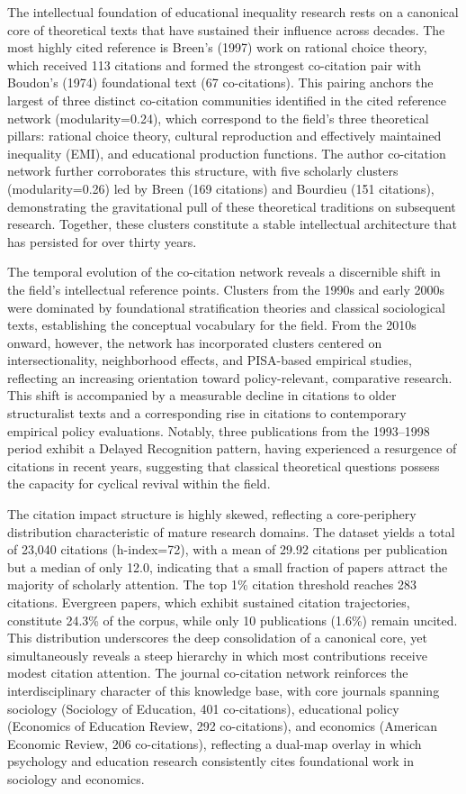 \documentclass[12pt,a4paper]{article}
\begin{document}
The intellectual foundation of educational inequality research rests on a canonical core of theoretical texts that have sustained their influence across decades. The most highly cited reference is Breen's (1997) work on rational choice theory, which received 113 citations and formed the strongest co-citation pair with Boudon's (1974) foundational text (67 co-citations). This pairing anchors the largest of three distinct co-citation communities identified in the cited reference network (modularity=0.24), which correspond to the field's three theoretical pillars: rational choice theory, cultural reproduction and effectively maintained inequality (EMI), and educational production functions. The author co-citation network further corroborates this structure, with five scholarly clusters (modularity=0.26) led by Breen (169 citations) and Bourdieu (151 citations), demonstrating the gravitational pull of these theoretical traditions on subsequent research. Together, these clusters constitute a stable intellectual architecture that has persisted for over thirty years.

The temporal evolution of the co-citation network reveals a discernible shift in the field's intellectual reference points. Clusters from the 1990s and early 2000s were dominated by foundational stratification theories and classical sociological texts, establishing the conceptual vocabulary for the field. From the 2010s onward, however, the network has incorporated clusters centered on intersectionality, neighborhood effects, and PISA-based empirical studies, reflecting an increasing orientation toward policy-relevant, comparative research. This shift is accompanied by a measurable decline in citations to older structuralist texts and a corresponding rise in citations to contemporary empirical policy evaluations. Notably, three publications from the 1993–1998 period exhibit a Delayed Recognition pattern, having experienced a resurgence of citations in recent years, suggesting that classical theoretical questions possess the capacity for cyclical revival within the field.

The citation impact structure is highly skewed, reflecting a core-periphery distribution characteristic of mature research domains. The dataset yields a total of 23,040 citations (h-index=72), with a mean of 29.92 citations per publication but a median of only 12.0, indicating that a small fraction of papers attract the majority of scholarly attention. The top 1\% citation threshold reaches 283 citations. Evergreen papers, which exhibit sustained citation trajectories, constitute 24.3\% of the corpus, while only 10 publications (1.6\%) remain uncited. This distribution underscores the deep consolidation of a canonical core, yet simultaneously reveals a steep hierarchy in which most contributions receive modest citation attention. The journal co-citation network reinforces the interdisciplinary character of this knowledge base, with core journals spanning sociology (Sociology of Education, 401 co-citations), educational policy (Economics of Education Review, 292 co-citations), and economics (American Economic Review, 206 co-citations), reflecting a dual-map overlay in which psychology and education research consistently cites foundational work in sociology and economics.
\end{document}
